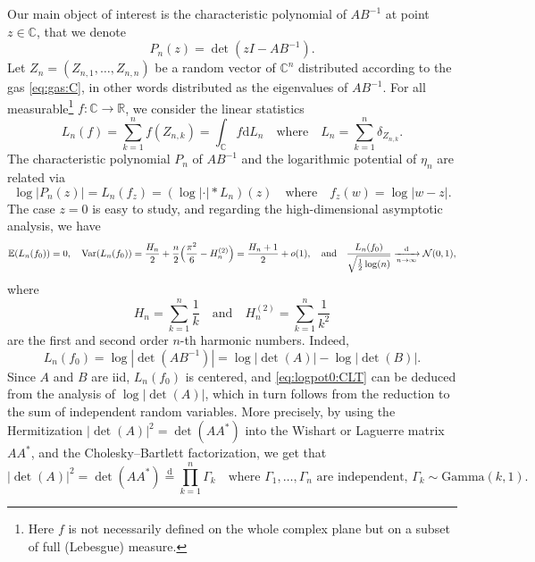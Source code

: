 \documentclass[10pt,reqno]{amsart}
\numberwithin{equation}{section}
\numberwithin{figure}{section}
\theoremstyle{plain}
\newcommand{\<}{\langle}
\renewcommand{\>}{\rangle}
\begin{document}
Our main object of interest is the characteristic polynomial of $AB^{-1}$ at point $z\in\mathbb{C}$, that we denote
\begin{equation}
  P_n(z)=\det(zI-AB^{-1}).
\end{equation}
Let $Z_n=(Z_{n,1},\ldots,Z_{n,n})$ be a random vector of $\mathbb{C}^n$
distributed according to the gas \eqref{eq:gas:C}, in other words distributed as the eigenvalues of $AB^{-1}$. For all measurable\footnote{Here $f$ is not necessarily defined on the whole complex plane but on a subset of full (Lebesgue) measure.}
$f:\mathbb{C}\to\mathbb{R}$, we consider the linear statistics
\begin{equation}
  L_n(f)=\sum_{k=1}^n f(Z_{n,k})=
  \int_{\mathbb C} f\mathrm{d}L_n
  \quad\text{where}\quad
  L_n=\sum_{k=1}^n\delta_{Z_{n,k}}.
\end{equation}
The characteristic polynomial $P_n$ of $AB^{-1}$ and the logarithmic potential of
$\eta_n$ are related via
\begin{equation}
  \log|P_n(z)|
  =L_n(f_z)
  =(\log\left|\cdot\right|*L_n)(z)
  \quad\text{where}\quad
  f_z(w)=\log|w-z|.
\end{equation}
The case $z=0$ is easy to study, and regarding the high-dimensional asymptotic analysis, we have
\begin{equation}\label{eq:logpot0:CLT}
  \mathbb{E}(L_n(f_0))=0,
  \quad
  \mathrm{Var}(L_n(f_0))=\frac{H_n}{2}+\frac{n}{2}\Bigl(\frac{\pi^2}{6}-H_n^{(2)}\Bigr)=\frac{H_n+1}{2}+o(1), %
  \quad\text{and}\quad
  \frac{L_n(f_0)}{\sqrt{\frac{1}{2}\log(n)}}
  \xrightarrow[n\to\infty]{\mathrm{d}}
  \mathcal{N}(0,1),
\end{equation}
where 
\begin{equation}
    H_n=\sum_{k=1}^n\frac{1}{k}
    \quad\text{and}\quad
    H_n^{(2)}=\sum_{k=1}^n\frac{1}{k^2} 
\end{equation}
are the first and second order $n$-th harmonic numbers. Indeed, 
\begin{equation}
    L_n(f_0)=\log|\det(AB^{-1})|=\log|\det(A)|-\log|\det(B)|.
\end{equation}
Since $A$ and $B$ are iid, $L_n(f_0)$ is centered, and \eqref{eq:logpot0:CLT} can be
deduced from the analysis of $\log|\det(A)|$, which in turn follows from the reduction to the sum of independent random variables. More precisely, by using the Hermitization $|\det(A)|^2=\det(AA^*)$ into the Wishart or Laguerre matrix $AA^*$, and the Cholesky--Bartlett factorization, we get that 
\begin{equation}\label{eq:log|det|Gamma}
|\det(A)|^2=\det(AA^*) \overset{\mathrm{d}}{=}\prod_{k=1}^n\Gamma_k
\quad\text{where $\Gamma_1,\ldots,\Gamma_n$ are independent, $\Gamma_k\sim\mathrm{Gamma}(k,1)$.}
\end{equation}
\end{document}
